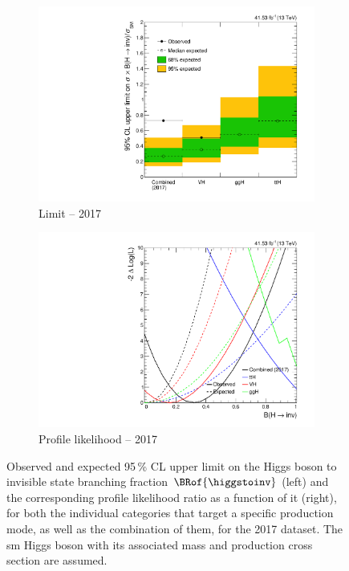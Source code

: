 \begin{figure}[htbp]
    \centering
    \begin{subfigure}[t]{0.45\textwidth}
        \includegraphics[width=\textwidth]{figures/limits/per_year/limit_2017_comb.pdf}
        \caption{Limit -- 2017}
    \end{subfigure}
    \hspace{0.05\textwidth}
    \begin{subfigure}[t]{0.45\textwidth}
        \includegraphics[width=\textwidth]{figures/likelihood_scan/profile_likelihood_scan_2017.pdf}
        \caption{Profile likelihood -- 2017}
    \end{subfigure}
    \caption[Observed and expected 95\,\% CL upper limit on the Higgs boson to invisible state branching fraction $\BRof{\higgstoinv}$ and the corresponding profile likelihood ratio as a function of it, for both the individual categories that target a specific production mode, as well as the combination of them, for the 2017 dataset]{Observed and expected 95\,\% CL upper limit on the Higgs boson to invisible state branching fraction $\BRof{\higgstoinv}$ (left) and the corresponding profile likelihood ratio as a function of it (right), for both the individual categories that target a specific production mode, as well as the combination of them, for the 2017 dataset. The \acrlong{sm} Higgs boson with its associated mass and production cross section are assumed.}
    \label{fig:htoinv_limit_likelihood_2017}
\end{figure}

